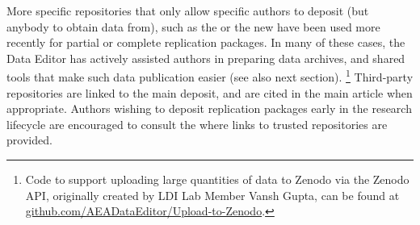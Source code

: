 More specific repositories that only allow specific authors to deposit (but anybody to obtain data from), such as the  or the new  have been used more recently for partial or complete replication packages. In many of these cases, the Data Editor has actively assisted authors in preparing  data archives, and shared tools that make such data publication easier (see also next section).%
\footnote{Code to support uploading large quantities of data to Zenodo via the Zenodo API, originally created by LDI Lab Member Vansh Gupta, can be found at \href{https://github.com/AEADataEditor/Upload-to-Zenodo}{github.com/AEADataEditor/Upload-to-Zenodo}.}  Third-party repositories are linked to the main \aeadcr{} deposit, and are cited in the main article when appropriate. Authors wishing to deposit replication packages early in the research lifecycle are encouraged to consult the  where links to trusted repositories are provided.  

